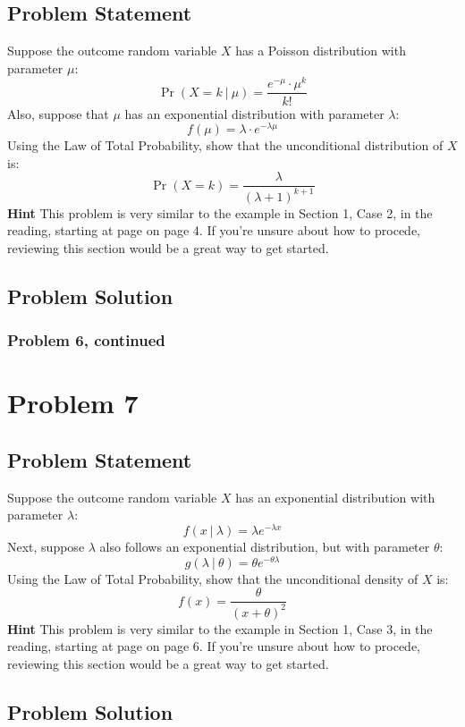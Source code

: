 \documentclass[12pt]{article}
\theoremstyle{definition}
\begin{document}
\subsection*{Problem Statement}

Suppose the outcome random variable $X$ has a Poisson distribution with parameter $\mu$:
$$
\Pr(X = k\ |\ \mu) = \frac{ e^{-\mu} \cdot \mu^k}{k!}
$$
Also, suppose that $\mu$ has an exponential distribution with parameter $\lambda$:
$$
f(\mu) = \lambda \cdot e^{-\lambda \mu}
$$
Using the Law of Total Probability, show that the unconditional distribution of $X$ is:
$$
\Pr( X = k ) = \frac{ \lambda }{(\lambda + 1)^{k+1}}
$$
{\bf Hint} This problem is very similar to the example in Section 1, Case 2, in the reading, starting at page on page 4. If you're unsure about how to procede, reviewing this section would be a great way to get started.


\subsection*{Problem Solution}


\newpage
\subsubsection*{Problem 6, continued}



\newpage
\section*{Problem 7}

\subsection*{Problem Statement}

Suppose the outcome random variable $X$ has an exponential distribution with parameter $\lambda$:
$$
f(x\ |\ \lambda) = \lambda  e^{-\lambda x}
$$
Next, suppose $\lambda$ also follows an exponential distribution, but with parameter $\theta$:
$$
g(\lambda\ |\ \theta) = \theta e^{-\theta \lambda}
$$
Using the Law of Total Probability, show that the unconditional density of $X$ is:
$$
f(x) = \frac{ \theta }{(x + \theta)^2}
$$
{\bf Hint} This problem is very similar to the example in Section 1, Case 3, in the reading, starting at page on page 6. If you're unsure about how to procede, reviewing this section would be a great way to get started.

\subsection*{Problem Solution}
\end{document}

